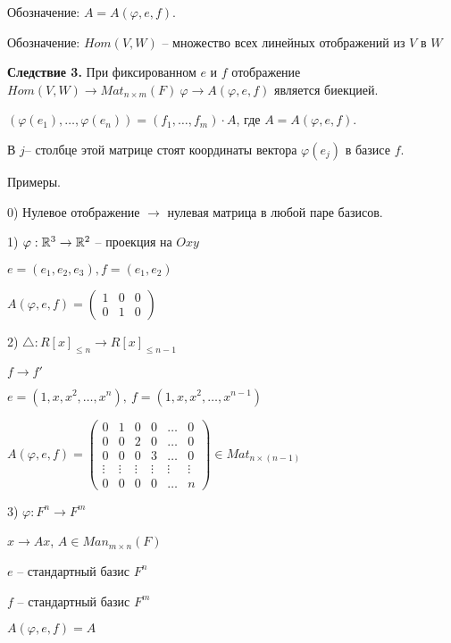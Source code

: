 Обозначение: $A = A (\varphi, e, f)$.

Обозначение: $Hom(V, W)$ -- множество всех линейных отображений из $V$ в $W$

\vspace{\baselineskip}
\textbf{Следствие 3.} При фиксированном $e$ и $f$ отображение $Hom(V, W) \rightarrow Mat_{n \times m} (F) \ \varphi \rightarrow A(\varphi, e, f)$ является биекцией.

\vspace{\baselineskip}
$(\varphi (e_1), \dots, \varphi(e_n)) = (f_1, \dots, f_m) \cdot A$, где $A = A(\varphi, e, f)$.

В $j$-- столбце этой матрице стоят координаты вектора $\varphi(e_j)$  в базисе $f$.

\vspace{\baselineskip}
Примеры.

0) Нулевое отображение $\rightarrow$ нулевая матрица в любой паре базисов.

1) $\varphi : \mathbb{R}^3 \rightarrow \mathbb{R}^2$ -- проекция на $Oxy$

$e = (e_1, e_2, e_3), f = (e_1, e_2)$

$A(\varphi, e, f) = \begin{pmatrix} 1 & 0 & 0 \\ 0 & 1 & 0 \end{pmatrix}$

2) $\triangle : R[x]_{\leq n} \rightarrow R[x]_{\leq n-1}$

$f \rightarrow f'$

$e = (1, x, x^2, \dots, x^n), \ f = (1, x, x^2, \dots, x^{n-1})$

$A(\varphi, e, f) = \begin{pmatrix} 0 & 1 & 0 & 0 & \dots & 0 \\ 0 & 0 & 2 & 0 & \dots & 0 \\ 0 & 0 & 0 & 3 & \dots & 0 \\ \vdots & \vdots & \vdots & \vdots & \vdots & \vdots \\ 0 & 0 & 0 & 0 & \dots & n \end{pmatrix} \in Mat_{n \times (n-1)}$

3) $\varphi : F^n \rightarrow F^m$

$x \rightarrow Ax$, $A \in Man_{m \times n} (F)$

$e$ -- стандартный базис $F^n$

$f$ -- стандартный базис $F^m$

$A(\varphi, e, f) = A$

